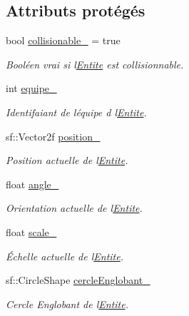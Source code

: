 \subsection*{Attributs protégés}
\begin{DoxyCompactItemize}
\item 
bool \hyperlink{class_entite_a37bb9bd568e9e1c904eaa83ec49a2b16}{collisionable\+\_\+} = true
\begin{DoxyCompactList}\small\item\em Booléen vrai si l\textquotesingle{}\hyperlink{class_entite}{Entite} est collisionnable. \end{DoxyCompactList}\item 
int \hyperlink{class_entite_a86f42758a3e4672052331b7a4daa10b5}{equipe\+\_\+}
\begin{DoxyCompactList}\small\item\em Identifaiant de l\textquotesingle{}équipe d\textquotesingle{} l\textquotesingle{}\hyperlink{class_entite}{Entite}. \end{DoxyCompactList}\item 
sf\+::\+Vector2f \hyperlink{class_entite_abbd554c4f122159a73cb113cc8de3860}{position\+\_\+}
\begin{DoxyCompactList}\small\item\em Position actuelle de l\textquotesingle{}\hyperlink{class_entite}{Entite}. \end{DoxyCompactList}\item 
float \hyperlink{class_entite_a2d6dc6bfcee492337b7422f12b393141}{angle\+\_\+}
\begin{DoxyCompactList}\small\item\em Orientation actuelle de l\textquotesingle{}\hyperlink{class_entite}{Entite}. \end{DoxyCompactList}\item 
float \hyperlink{class_entite_a50e0f8c1188d9833432c55c7f7d2aa0f}{scale\+\_\+}
\begin{DoxyCompactList}\small\item\em Échelle actuelle de l\textquotesingle{}\hyperlink{class_entite}{Entite}. \end{DoxyCompactList}\item 
sf\+::\+Circle\+Shape \hyperlink{class_entite_a5b6c62e4dc54221a84ce4dc824fdb2da}{cercle\+Englobant\+\_\+}
\begin{DoxyCompactList}\small\item\em Cercle Englobant de l\textquotesingle{}\hyperlink{class_entite}{Entite}. \end{DoxyCompactList}\item 

\end{DoxyCompactItemize}
